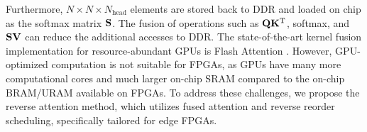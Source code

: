 \documentclass[sigconf]{acmart}
\begin{document}

Furthermore, $N \times N \times N_{\text{head}}$ elements are stored back to DDR and loaded on chip as the softmax matrix $\bf S$.
The fusion of operations such as \( {\bf Q} {\bf K}^{\text{T}} \), softmax, and \( \bf S  {\bf V} \) can reduce the additional accesses to DDR. The state-of-the-art kernel fusion implementation for resource-abundant GPUs is Flash Attention \cite{dao2022flashattentionfastmemoryefficientexact}. However, GPU-optimized computation is not suitable for FPGAs, as GPUs have many more computational cores and much larger on-chip SRAM compared to the on-chip BRAM/URAM available on FPGAs. To address these challenges, we propose the reverse attention method, which utilizes fused attention and reverse reorder scheduling, specifically tailored for edge FPGAs.



\end{document}
